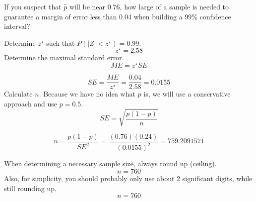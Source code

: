 
\begin{question}
If you suspect that \(\hat{p}\) will be near 0.76, how large of a sample
is needed to guarantee a margin of error less than 0.04 when building a
99\% confidence interval?
\end{question}

\begin{solution}
Determine \(z^\star\) such that \(P(|Z|<z^\star) = 0.99\).
\[z^\star = 2.58\] Determine the maximal standard error.
\[ME = z^\star SE \]

\[SE = \frac{ME}{z^\star} = \frac{0.04}{2.58} = 0.0155 \] Calculate
\(n\). Because we have no idea what \(p\) is, we will use a conservative
approach and use \(p=0.5\). \[SE = \sqrt{\frac{p(1-p)}{n}}\]

\[n = \frac{p(1-p)}{SE^2} = \frac{(0.76)(0.24)}{(0.0155)^2} = 759.2091571\]

When determining a necessary sample size, always round up (ceiling).
\[n = 760 \] Also, for simplicity, you should probably only use about 2
significant digits, while still rounding up. \[n = 760 \]
\end{solution}

